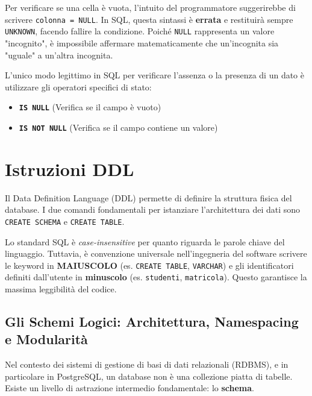 \begin{warningbox}[La trappola del NULL: IS NULL vs = NULL]
Per verificare se una cella è vuota, l'intuito del programmatore suggerirebbe di scrivere \texttt{colonna = NULL}. In SQL, questa sintassi è \textbf{errata} e restituirà sempre \texttt{UNKNOWN}, facendo fallire la condizione. Poiché \texttt{NULL} rappresenta un valore "incognito", è impossibile affermare matematicamente che un'incognita sia "uguale" a un'altra incognita. 

L'unico modo legittimo in SQL per verificare l'assenza o la presenza di un dato è utilizzare gli operatori specifici di stato:
\begin{itemize}
    \item \texttt{\textbf{IS NULL}} (Verifica se il campo è vuoto)
    \item \texttt{\textbf{IS NOT NULL}} (Verifica se il campo contiene un valore)
\end{itemize}
\end{warningbox}

\section{Istruzioni DDL}

Il Data Definition Language (DDL) permette di definire la struttura fisica del database. I due comandi fondamentali per istanziare l'architettura dei dati sono \texttt{CREATE SCHEMA} e \texttt{CREATE TABLE}.

\begin{bestpractice}
Lo standard SQL è \textit{case-insensitive} per quanto riguarda le parole chiave del linguaggio. Tuttavia, è convenzione universale nell'ingegneria del software scrivere le keyword in \textbf{MAIUSCOLO} (es. \texttt{CREATE TABLE}, \texttt{VARCHAR}) e gli identificatori definiti dall'utente in \textbf{minuscolo} (es. \texttt{studenti}, \texttt{matricola}). Questo garantisce la massima leggibilità del codice.
\end{bestpractice}

\subsection{Gli Schemi Logici: Architettura, Namespacing e Modularità}

Nel contesto dei sistemi di gestione di basi di dati relazionali (RDBMS), e in particolare in PostgreSQL, un database non è una collezione piatta di tabelle. Esiste un livello di astrazione intermedio fondamentale: lo \textbf{schema}.

